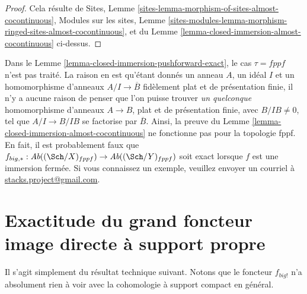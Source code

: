 \begin{proof}
Cela r\'esulte de
Sites, Lemme \ref{sites-lemma-morphism-of-sites-almost-cocontinuous},
Modules sur les sites,
Lemme \ref{sites-modules-lemma-morphism-ringed-sites-almost-cocontinuous},
et du
Lemme \ref{lemma-closed-immersion-almost-cocontinuous}
ci-dessus.
\end{proof}

\begin{remark}
\label{remark-fppf-closed-immersion-not-closed}
Dans le Lemme \ref{lemma-closed-immersion-pushforward-exact}, le cas $\tau = fppf$
n'est pas trait\'e. La raison en est qu'\'etant donn\'es un anneau $A$, un id\'eal $I$ et un
homomorphisme d'anneaux $A/I \to \overline{B}$ fid\`element plat et de pr\'esentation finie, il
n'y a aucune raison de penser que l'on puisse trouver {\it un quelconque} homomorphisme d'anneaux
$A \to B$, plat et de pr\'esentation finie, avec $B/IB \not = 0$, tel que $A/I \to B/IB$ se factorise par
$\overline{B}$. Ainsi, la preuve du
Lemme \ref{lemma-closed-immersion-almost-cocontinuous}
ne fonctionne pas pour la topologie fppf.
En fait, il est probablement faux que
$f_{big, *} : \textit{Ab}((\Sch/X)_{fppf})
\to \textit{Ab}((\Sch/Y)_{fppf})$
soit exact lorsque $f$ est une immersion ferm\'ee.
Si vous connaissez un exemple, veuillez envoyer un courriel \`a
\href{mailto:stacks.project@gmail.com}{stacks.project@gmail.com}.
\end{remark}












\section{Exactitude du grand foncteur image directe \`a support propre}
\label{section-exactness-lower-shriek}

\noindent
Il s'agit simplement du r\'esultat technique suivant. Notons que le foncteur $f_{big!}$
n'a absolument rien \`a voir avec la cohomologie \`a support compact en
g\'en\'eral.

